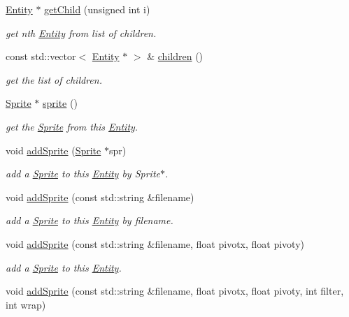 \begin{DoxyCompactItemize}
\hyperlink{class_entity}{Entity} $\ast$ \hyperlink{class_entity_a86a7a735f9046c4ff3800a80f8ffd1ac}{get\+Child} (unsigned int i)
\begin{DoxyCompactList}\small\item\em get nth \hyperlink{class_entity}{Entity} from list of children. \end{DoxyCompactList}\item 
const std\+::vector$<$ \hyperlink{class_entity}{Entity} $\ast$ $>$ \& \hyperlink{class_entity_a1975d28f88ddd1afb83332245b194c79}{children} ()
\begin{DoxyCompactList}\small\item\em get the list of children. \end{DoxyCompactList}\item 
\hyperlink{class_sprite}{Sprite} $\ast$ \hyperlink{class_entity_a766b6c5da328efaa419bebe4f67479b9}{sprite} ()
\begin{DoxyCompactList}\small\item\em get the \hyperlink{class_sprite}{Sprite} from this \hyperlink{class_entity}{Entity}. \end{DoxyCompactList}\item 
void \hyperlink{class_entity_ae35b690cfec7ef9a0061338d7b83cfc4}{add\+Sprite} (\hyperlink{class_sprite}{Sprite} $\ast$spr)
\begin{DoxyCompactList}\small\item\em add a \hyperlink{class_sprite}{Sprite} to this \hyperlink{class_entity}{Entity} by Sprite$\ast$. \end{DoxyCompactList}\item 
void \hyperlink{class_entity_ab2501f9df0591cc5fd0535b15b2bb818}{add\+Sprite} (const std\+::string \&filename)
\begin{DoxyCompactList}\small\item\em add a \hyperlink{class_sprite}{Sprite} to this \hyperlink{class_entity}{Entity} by filename. \end{DoxyCompactList}\item 
void \hyperlink{class_entity_a5017dd79d0edad03fb7bd90df7eea867}{add\+Sprite} (const std\+::string \&filename, float pivotx, float pivoty)
\begin{DoxyCompactList}\small\item\em add a \hyperlink{class_sprite}{Sprite} to this \hyperlink{class_entity}{Entity}. \end{DoxyCompactList}\item 
void \hyperlink{class_entity_ae1a2eddd848404c8a9254f11036d00f5}{add\+Sprite} (const std\+::string \&filename, float pivotx, float pivoty, int filter, int wrap)

\end{DoxyCompactItemize}
